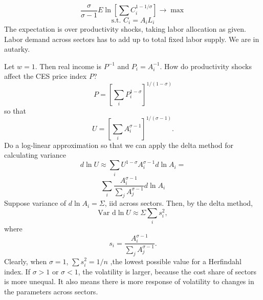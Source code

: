 \documentclass[12pt]{article}
\begin{document}
\begin{equation}
	\frac \sigma{\sigma-1}
	E \ln\left[
	 \sum C_i^{1-1/\sigma}
	 \right] \to \max
\end{equation}
\[
\text{s.t. }
C_i = A_i L_i 
\]
The expectation is over productivity shocks, taking labor allocation as given. Labor demand across sectors has to add up to total fixed labor supply. We are in autarky.

Let $w=1$. Then real income is $P^{-1}$ and $P_i=A_i^{-1}$. How do productivity shocks affect the CES price index $P$?
\[
P = \left[\sum_i P_i^{1-\sigma}
\right]^{1/(1-\sigma)}
\]
so that
\[
U = \left[\sum_i A_i^{\sigma-1}
\right]^{1/(\sigma-1)}.
\]
Do a log-linear approximation so that we can apply the delta method for calculating variance
\[
d\ln U \approx
\sum_i U^{1-\sigma}
 A_i^{\sigma-1}
d\ln A_i=
\]
\[
\sum_i\frac{A_i^{\sigma-1}}
	{\sum_j A_j^{\sigma-1}}
d\ln A_i
\]
Suppose variance of $d\ln A_i=\Sigma$, iid across sectors. Then, by the delta method,
\[
\text{Var d}\ln U \approx \Sigma \sum_i s_i^2,
\]
where 
\[
s_i = \frac{A_i^{\sigma-1}}
	{\sum_j A_j^{\sigma-1}}.
\]
Clearly, when $\sigma=1$, $\sum s_i^2 = 1/n$ ,the lowest possible value for a Herfindahl index. If $\sigma>1$ or $\sigma<1$, the volatility is larger, because the cost share of sectors is more unequal. It also means there is more response of volatility to changes in the parameters across sectors.  
\end{document}
